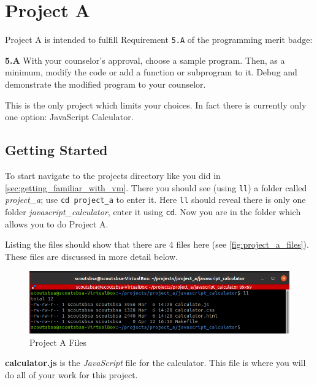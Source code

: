 \graphicspath{ {images/project_a} }

\chapter{Project A}
\label{chap:project_a}

  Project A is intended to fulfill Requirement \texttt{5.A} of the programming merit badge:

  \vspace{5pt}
  \begin{mdframed}[]
    \textbf{5.A} 
      With your counselor’s approval, choose a sample program.
      Then, as a minimum, modify the code or add a function or subprogram to it. 
      Debug and demonstrate the modified program to your counselor.
  \end{mdframed}

  This is the only project which limits your choices.
  In fact there is currently only one option: JavaScript Calculator.

  \section{Getting Started}
  \label{sec:proj_a_getting_started}

    To start navigate to the projects directory like you did in \autoref{sec:getting_familiar_with_vm}.
    There you should see (using \texttt{ll}) a folder called \textit{project\_a}; use \texttt{cd project\_a} to enter it.
    Here \texttt{ll} should reveal there is only one folder \textit{javascript\_calculator}, enter it using \texttt{cd}.
    Now you are in the folder which allows you to do Project A.

    Listing the files should show that there are 4 files here (see \autoref{fig:project_a_files}).
    These files are discussed in more detail below.

    \begin{figure}[ht]
      \centering
      \includegraphics[width=0.8\linewidth]{project_a_files.png}
      \caption{Project A Files}
      \label{fig:project_a_files}
    \end{figure}
    \FloatBarrier

    \textbf{calculator.js} is the \textit{JavaScript} file for the calculator. 
    This file is where you will do all of your work for this project.

